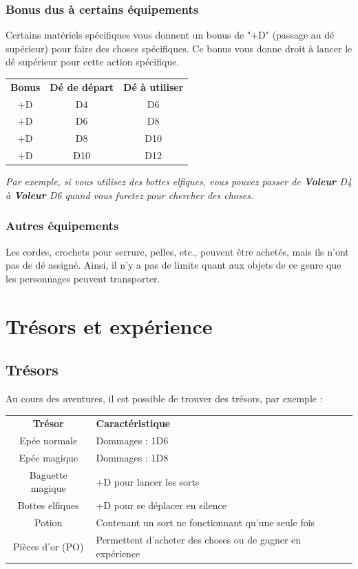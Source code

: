 \documentclass[a4paper, 11pt, twoside]{article}
\begin{document}
\subsubsection{Bonus dus à certains équipements}
\label{sec:org6e04370}

Certains matériels spécifiques vous donnent un bonus de "+D" (passage au dé supérieur) pour faire des choses spécifiques. Ce bonus vous donne droit à lancer le dé supérieur pour cette action spécifique.

\begin{longtable}{ccc}
\textbf{Bonus} & \textbf{Dé de départ} & \textbf{Dé à utiliser}\\
+D & D4 & D6\\
+D & D6 & D8\\
+D & D8 & D10\\
+D & D10 & D12\\
\end{longtable}

\emph{Par exemple, si vous utilisez des bottes elfiques, vous pouvez passer de \textbf{Voleur} D4 à \textbf{Voleur} D6 quand vous furetez pour chercher des choses.}

\subsubsection{Autres équipements}
\label{sec:org2add67c}

Les cordes, crochets pour serrure, pelles, etc., peuvent être achetés, mais ils n'ont pas de dé assigné. Ainsi, il n'y a pas de limite quant aux objets de ce genre que les personnages peuvent transporter.

\section{Trésors et expérience}
\label{sec:org67457b0}
\subsection{Trésors}
\label{sec:org9e87ac1}

Au cours des aventures, il est possible de trouver des trésors, par exemple :

\begin{longtable}{cl}
\textbf{Trésor} & \textbf{Caractéristique}\\
Epée normale & Dommages : 1D6\\
Epée magique & Dommages : 1D8\\
Baguette magique & +D pour lancer les sorts\\
Bottes elfiques & +D pour se déplacer en silence\\
Potion & Contenant un sort ne fonctionnant qu'une seule fois\\
Pièces d'or (PO) & Permettent d'acheter des choses ou de gagner en expérience\\
\end{longtable}
\end{document}
